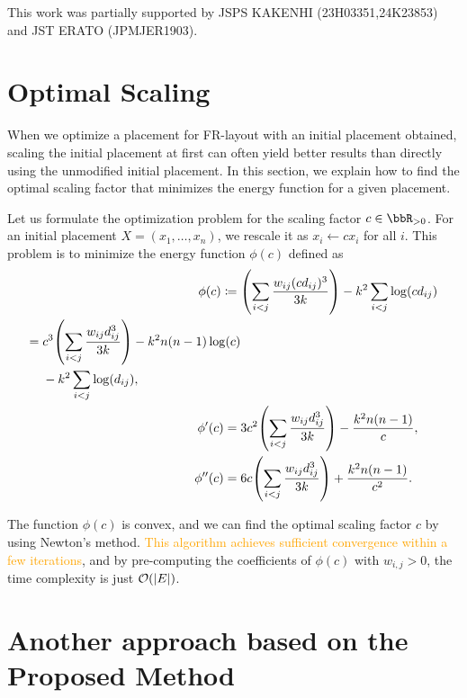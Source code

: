 \documentclass[dvipdfmx,journal]{IEEEtran}
\newcommand{\orange}[1]{\textcolor{orange}{#1}}
\newcommand{\defeq}{\coloneqq}
\begin{document}
This work was partially supported by JSPS KAKENHI (23H03351,24K23853) and JST ERATO (JPMJER1903).


\appendices

\section{Optimal Scaling}\label{sec:scaling}

When we optimize a placement for FR-layout with an initial placement obtained, scaling the initial placement at first can often yield better results than directly using the unmodified initial placement.
In this section, we explain how to find the optimal scaling factor that minimizes the energy function for a given placement.

Let us formulate the optimization problem for the scaling factor $c \in \bbR_{> 0}$. For an initial placement $X = (x_1, \dots, x_n)$, we rescale it as $x_i \gets c x_i$ for all $i$.
This problem is to minimize the energy function $\phi(c)$ defined as
\begin{align*}
    \phi(c) \defeq {} & \qty(\sum_{i < j} \frac{w_{ij} (cd_{ij})^3}{3k}) - k^2 \sum_{i < j} \log(c d_{ij})                                   \\
    \begin{split}
        = {} & c^3 \qty(\sum_{i < j} \frac{w_{ij} d_{ij}^3}{3k}) - k^2 n(n-1)\log(c) \\
             & - k^2 \sum_{i < j} \log(d_{ij}),
    \end{split} \\
    \phi'(c) = {}     & 3c^2 \qty(\sum_{i < j} \frac{w_{ij} d_{ij}^3}{3k}) - \frac{k^2 n(n-1)}{c},                                           \\
    \phi''(c) = {}    & 6c \qty(\sum_{i < j} \frac{w_{ij} d_{ij}^3}{3k}) + \frac{k^2 n(n-1)}{c^2}.
\end{align*}

The function $\phi(c)$ is convex, and we can find the optimal scaling factor $c$ by using Newton's method.
\orange{This algorithm achieves sufficient convergence within a few iterations}, and by pre-computing the coefficients of $\phi(c)$ with $w_{i,j} > 0$, the time complexity is just $\order{\abs{E}}$.

\section{Another approach based on the Proposed Method}\label{sec:anotherApproach}
\end{document}
